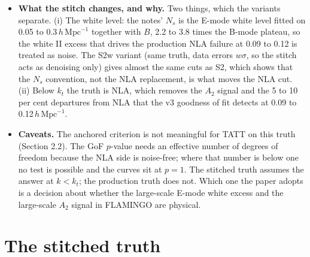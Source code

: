 \documentclass[11pt]{article}
\newcommand{\hmpc}{\,h\,\mathrm{Mpc}^{-1}}
\begin{document}
\begin{itemize}
  $\Omega_m$, not $S_8$ (Section 7).
\item \textbf{What the stitch changes, and why.} Two things, which the
  variants separate. (i) The white level: the notes' $N_s$ is the E-mode
  white level fitted on 0.05 to 0.3$\hmpc$ together with $B$, 2.2 to 3.8
  times the B-mode plateau, so the white II excess that drives the production
  NLA failure at 0.09 to 0.12 is treated as noise. The S2w variant (same
  truth, data errors $w\sigma$, so the stitch acts as denoising only) gives
  almost the same cuts as S2, which shows that the $N_s$ convention, not the
  NLA replacement, is what moves the NLA cut. (ii) Below $k_t$ the truth is
  NLA, which removes the $A_2$ signal and the 5 to 10 per cent departures
  from NLA that the v3 goodness of fit detects at 0.09 to 0.12$\hmpc$.
\item \textbf{Caveats.} The anchored criterion is not meaningful for TATT on
  this truth (Section 2.2). The GoF $p$-value needs an effective number of
  degrees of freedom because the NLA side is noise-free; where that number
  is below one no test is possible and the curves sit at $p = 1$. The
  stitched truth assumes the answer at $k < k_t$; the production truth does
  not. Which one the paper adopts is a decision about whether the
  large-scale E-mode white excess and the large-scale $A_2$ signal in
  FLAMINGO are physical.
\end{itemize}

\section{The stitched truth}
\end{document}
